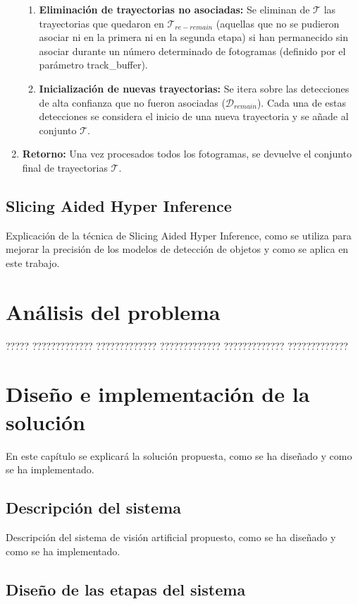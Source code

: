 \documentclass[11pt,spanish,listoffigures,listoftables]{tfgetsinf}
\begin{document}
\begin{enumerate}
{\begin{enumerate}
      \item \textbf{Eliminación de trayectorias no asociadas:} Se eliminan de $\mathcal{T}$ las trayectorias que quedaron en $\mathcal{T}_{re-remain}$ (aquellas que no se pudieron asociar ni en la primera ni en la segunda etapa) si han permanecido sin asociar durante un número determinado de fotogramas (definido por el parámetro track\_buffer).
      \item \textbf{Inicialización de nuevas trayectorias:} Se itera sobre las detecciones de alta confianza que no fueron asociadas ($\mathcal{D}_{remain}$). Cada una de estas detecciones se considera el inicio de una nueva trayectoria y se añade al conjunto $\mathcal{T}$.
   \end{enumerate}
   } %
   \item \textbf{Retorno:} Una vez procesados todos los fotogramas, se devuelve el conjunto final de trayectorias $\mathcal{T}$.
\end{enumerate}




\section{Slicing Aided Hyper Inference}
Explicación de la técnica de Slicing Aided Hyper Inference, como se utiliza para mejorar la precisión de los modelos de detección de objetos y como se aplica en este trabajo.

\chapter{Análisis del problema}

????? ????????????? ????????????? ????????????? ????????????? ????????????? 

\chapter{Diseño e implementación de la solución}
En este capítulo se explicará la solución propuesta, como se ha diseñado y como se ha implementado.

\section{Descripción del sistema}

Descripción del sistema de visión artificial propuesto, como se ha diseñado y como se ha implementado.

\section{Diseño de las etapas del sistema}
\end{document}
